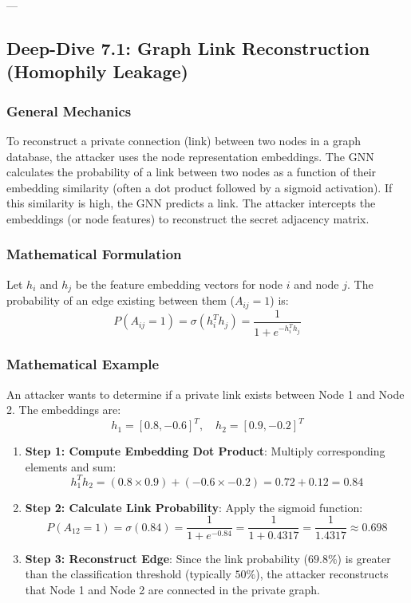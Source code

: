 \documentclass{article}
\begin{document}
---

\subsection{Deep-Dive 7.1: Graph Link Reconstruction (Homophily Leakage)}

\subsubsection{General Mechanics}
To reconstruct a private connection (link) between two nodes in a graph database, the attacker uses the node representation embeddings. The GNN calculates the probability of a link between two nodes as a function of their embedding similarity (often a dot product followed by a sigmoid activation). If this similarity is high, the GNN predicts a link. The attacker intercepts the embeddings (or node features) to reconstruct the secret adjacency matrix.

\subsubsection{Mathematical Formulation}
Let $h_i$ and $h_j$ be the feature embedding vectors for node $i$ and node $j$. The probability of an edge existing between them ($A_{ij} = 1$) is:
\begin{equation}
    P(A_{ij} = 1) = \sigma\left( h_i^T h_j \right) = \frac{1}{1 + e^{-h_i^T h_j}}
\end{equation}

\subsubsection{Mathematical Example}
An attacker wants to determine if a private link exists between Node 1 and Node 2. The embeddings are:
$$h_1 = [0.8, -0.6]^T, \quad h_2 = [0.9, -0.2]^T$$
\begin{enumerate}
    \item \textbf{Step 1: Compute Embedding Dot Product}: Multiply corresponding elements and sum:
    $$h_1^T h_2 = (0.8 \times 0.9) + (-0.6 \times -0.2) = 0.72 + 0.12 = 0.84$$
    
    \item \textbf{Step 2: Calculate Link Probability}: Apply the sigmoid function:
    $$P(A_{12} = 1) = \sigma(0.84) = \frac{1}{1 + e^{-0.84}} = \frac{1}{1 + 0.4317} = \frac{1}{1.4317} \approx 0.698$$
    
    \item \textbf{Step 3: Reconstruct Edge}: Since the link probability ($69.8\%$) is greater than the classification threshold (typically $50\%$), the attacker reconstructs that Node 1 and Node 2 are connected in the private graph.
\end{enumerate}
\end{document}
